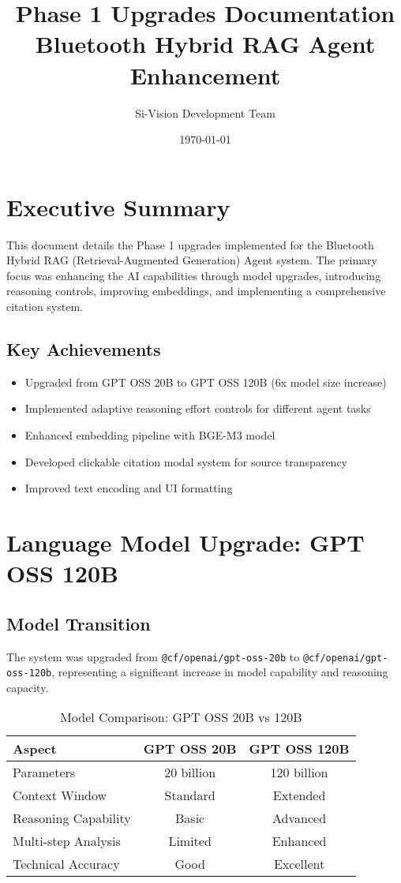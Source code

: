 \documentclass[12pt,a4paper]{article}
\title{\textbf{Phase 1 Upgrades Documentation} \\
       \large Bluetooth Hybrid RAG Agent Enhancement}
\author{Si-Vision Development Team}
\date{\today}
\begin{document}
\maketitle

\tableofcontents
\newpage

\section{Executive Summary}

This document details the Phase 1 upgrades implemented for the Bluetooth Hybrid RAG (Retrieval-Augmented Generation) Agent system. The primary focus was enhancing the AI capabilities through model upgrades, introducing reasoning controls, improving embeddings, and implementing a comprehensive citation system.

\subsection{Key Achievements}
\begin{itemize}
    \item Upgraded from GPT OSS 20B to GPT OSS 120B (6x model size increase)
    \item Implemented adaptive reasoning effort controls for different agent tasks
    \item Enhanced embedding pipeline with BGE-M3 model
    \item Developed clickable citation modal system for source transparency
    \item Improved text encoding and UI formatting
\end{itemize}

\section{Language Model Upgrade: GPT OSS 120B}

\subsection{Model Transition}
The system was upgraded from \texttt{@cf/openai/gpt-oss-20b} to \texttt{@cf/openai/gpt-oss-120b}, representing a significant increase in model capability and reasoning capacity.

\begin{table}[h]
\centering
\begin{tabular}{@{}lcc@{}}
\toprule
\textbf{Aspect} & \textbf{GPT OSS 20B} & \textbf{GPT OSS 120B} \\
\midrule
Parameters & 20 billion & 120 billion \\
Context Window & Standard & Extended \\
Reasoning Capability & Basic & Advanced \\
Multi-step Analysis & Limited & Enhanced \\
Technical Accuracy & Good & Excellent \\
\bottomrule
\end{tabular}
\caption{Model Comparison: GPT OSS 20B vs 120B}
\end{table}
\end{document}
